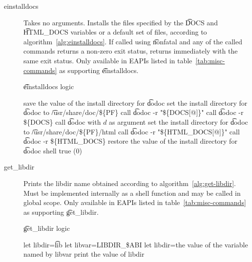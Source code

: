 \begin{description}
\item[einstalldocs]  Takes no arguments. Installs the files specified
    by the \t{DOCS} and \t{HTML_DOCS} variables or a default set of files, according to
    algorithm~\ref{alg:einstalldocs}. If called using \t{nonfatal} and any of the called commands
    returns a non-zero exit status, returns immediately with the same exit status. Only available
    in EAPIs listed in table~\ref{tab:misc-commands} as supporting \t{einstalldocs}.

\begin{algorithm}
\caption{\t{einstalldocs} logic} \label{alg:einstalldocs}
\begin{algorithmic}[1]
\STATE save the value of the install directory for \t{dodoc}
\STATE set the install directory for \t{dodoc} to \t{/usr/share/doc/\$\{PF\}}
    \STATE call \t{dodoc -r "\$\{DOCS[@]\}"}
    \STATE call \t{dodoc -r \$\{DOCS\}}
            \STATE call \t{dodoc} with $d$ as argument
        \ENDIF
    \ENDFOR
\ENDIF
\STATE set the install directory for \t{dodoc} to \t{/usr/share/doc/\$\{PF\}/html}
    \STATE call \t{dodoc -r "\$\{HTML_DOCS[@]\}"}
    \STATE call \t{dodoc -r \$\{HTML_DOCS\}}
\ENDIF
\STATE restore the value of the install directory for \t{dodoc}
\RETURN shell true (0)
\end{algorithmic}
\end{algorithm}

\item[get_libdir]  Prints the libdir name obtained according to
    algorithm~\ref{alg:get-libdir}. Must be implemented internally as a shell function and may be
    called in global scope. Only available in EAPIs listed in table~\ref{tab:misc-commands} as
    supporting \t{get_libdir}.

\begin{algorithm}
\caption{\t{get_libdir} logic} \label{alg:get-libdir}
\begin{algorithmic}[1]
\STATE let libdir=\t{lib}
    \STATE let libvar=LIBDIR_\$ABI
        \STATE let libdir=the value of the variable named by libvar
    \ENDIF
\ENDIF
\STATE print the value of libdir
\end{algorithmic}
\end{algorithm}

\end{description}

